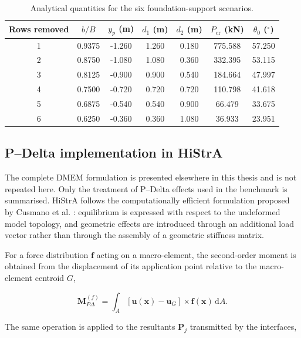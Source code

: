 \begin{table}[htbp]
\centering
\caption{Analytical quantities for the six foundation-support scenarios.}
\label{tab:wall-validation-scenarios}
\begin{tabular}{ccccccc}
\hline
Rows removed & $b/B$ & $y_p$ (m) & $d_1$ (m) & $d_2$ (m)
& $P_{\mathrm{cr}}$ (kN) & $\theta_0$ ($^\circ$)\\
\hline
1 & 0.9375 & -1.260 & 1.260 & 0.180 & 775.588 & 57.250\\
2 & 0.8750 & -1.080 & 1.080 & 0.360 & 332.395 & 53.115\\
3 & 0.8125 & -0.900 & 0.900 & 0.540 & 184.664 & 47.997\\
4 & 0.7500 & -0.720 & 0.720 & 0.720 & 110.798 & 41.618\\
5 & 0.6875 & -0.540 & 0.540 & 0.900 &  66.479 & 33.675\\
6 & 0.6250 & -0.360 & 0.360 & 1.080 &  36.933 & 23.951\\
\hline
\end{tabular}
\end{table}

\subsection{P--Delta implementation in HiStrA}
\label{sec:wall-validation-pdelta-implementation}

The complete \gls{DMEM} formulation is presented elsewhere in this thesis and
is not repeated here. Only the treatment of P--Delta effects used in the
benchmark is summarised. HiStrA follows the computationally efficient
formulation proposed by Cusmano et al. \cite{Cusmano2023}: equilibrium is expressed with
respect to the undeformed model topology, and geometric effects are introduced
through an additional load vector rather than through the assembly of a
geometric stiffness matrix.

For a force distribution $\mathbf{f}$ acting on a macro-element, the
second-order moment is obtained from the displacement of its application
point relative to the macro-element centroid $G$,

\begin{equation}
\mathbf{M}_{P\Delta}^{(f)}=
\int_A\left[\mathbf{u}(\mathbf{x})-\mathbf{u}_G\right]
\times\mathbf{f}(\mathbf{x})\,\mathrm{d}A.
\label{eq:wall-validation-pdelta-external}
\end{equation}

The same operation is applied to the resultants $\mathbf{P}_j$ transmitted by
the interfaces,

